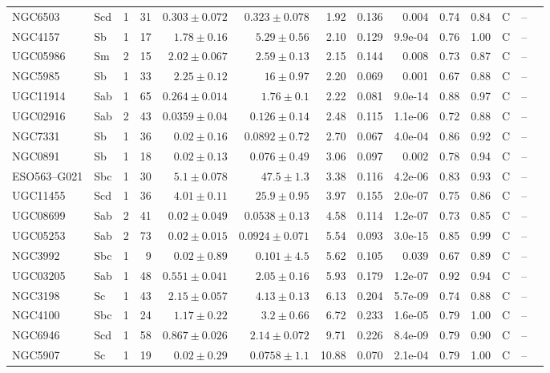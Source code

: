 \documentclass[9pt]{extarticle}
\begin{document}
{\begin{longtable}{lllrrrrrrrrcrl}
NGC6503 & Scd & 1 & 31 & $0.303\pm0.072$ & $0.323\pm0.078$ & 1.92 & 0.136 & 0.004 & 0.74 & 0.84 & C & -- & \\
NGC4157 & Sb & 1 & 17 & $1.78\pm0.16$ & $5.29\pm0.56$ & 2.10 & 0.129 & 9.9e-04 & 0.76 & 1.00 & C & -- & \\
UGC05986 & Sm & 2 & 15 & $2.02\pm0.067$ & $2.59\pm0.13$ & 2.15 & 0.144 & 0.008 & 0.73 & 0.87 & C & -- & \\
NGC5985 & Sb & 1 & 33 & $2.25\pm0.12$ & $16\pm0.97$ & 2.20 & 0.069 & 0.001 & 0.67 & 0.88 & C & -- & \\
UGC11914 & Sab & 1 & 65 & $0.264\pm0.014$ & $1.76\pm0.1$ & 2.22 & 0.081 & 9.0e-14 & 0.88 & 0.97 & C & -- & \\
UGC02916 & Sab & 2 & 43 & $0.0359\pm0.04$ & $0.126\pm0.14$ & 2.48 & 0.115 & 1.1e-06 & 0.72 & 0.88 & C & -- & \\
NGC7331 & Sb & 1 & 36 & $0.02\pm0.16$ & $0.0892\pm0.72$ & 2.70 & 0.067 & 4.0e-04 & 0.86 & 0.92 & C & -- & \\
NGC0891 & Sb & 1 & 18 & $0.02\pm0.13$ & $0.076\pm0.49$ & 3.06 & 0.097 & 0.002 & 0.78 & 0.94 & C & -- & \\
ESO563--G021 & Sbc & 1 & 30 & $5.1\pm0.078$ & $47.5\pm1.3$ & 3.38 & 0.116 & 4.2e-06 & 0.83 & 0.93 & C & -- & \\
UGC11455 & Scd & 1 & 36 & $4.01\pm0.11$ & $25.9\pm0.95$ & 3.97 & 0.155 & 2.0e-07 & 0.75 & 0.86 & C & -- & \\
UGC08699 & Sab & 2 & 41 & $0.02\pm0.049$ & $0.0538\pm0.13$ & 4.58 & 0.114 & 1.2e-07 & 0.73 & 0.85 & C & -- & \\
UGC05253 & Sab & 2 & 73 & $0.02\pm0.015$ & $0.0924\pm0.071$ & 5.54 & 0.093 & 3.0e-15 & 0.85 & 0.99 & C & -- & \\
NGC3992 & Sbc & 1 & 9 & $0.02\pm0.89$ & $0.101\pm4.5$ & 5.62 & 0.105 & 0.039 & 0.67 & 0.89 & C & -- & \\
UGC03205 & Sab & 1 & 48 & $0.551\pm0.041$ & $2.05\pm0.16$ & 5.93 & 0.179 & 1.2e-07 & 0.92 & 0.94 & C & -- & \\
NGC3198 & Sc & 1 & 43 & $2.15\pm0.057$ & $4.13\pm0.13$ & 6.13 & 0.204 & 5.7e-09 & 0.74 & 0.88 & C & -- & \\
NGC4100 & Sbc & 1 & 24 & $1.17\pm0.22$ & $3.2\pm0.66$ & 6.72 & 0.233 & 1.6e-05 & 0.79 & 1.00 & C & -- & \\
NGC6946 & Scd & 1 & 58 & $0.867\pm0.026$ & $2.14\pm0.072$ & 9.71 & 0.226 & 8.4e-09 & 0.79 & 0.90 & C & -- & \\
NGC5907 & Sc & 1 & 19 & $0.02\pm0.29$ & $0.0758\pm1.1$ & 10.88 & 0.070 & 2.1e-04 & 0.79 & 1.00 & C & -- & \\

\end{longtable}}
\end{document}
